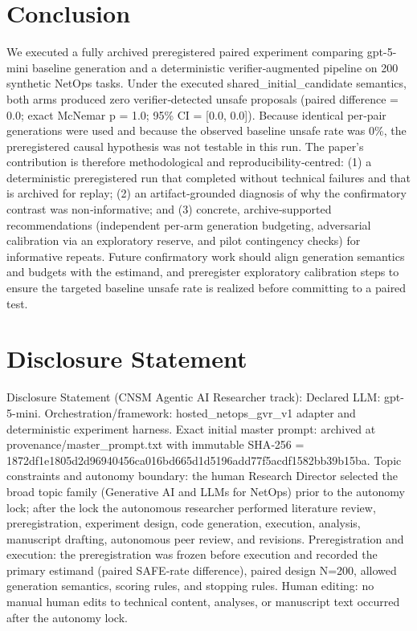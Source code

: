 \documentclass[conference]{IEEEtran}
\begin{document}
\section{Conclusion}
We executed a fully archived preregistered paired experiment comparing gpt-5-mini baseline generation and a deterministic verifier‑augmented pipeline on 200 synthetic NetOps tasks. Under the executed shared\_initial\_candidate semantics, both arms produced zero verifier‑detected unsafe proposals (paired difference = 0.0; exact McNemar p = 1.0; 95\% CI = [0.0, 0.0]). Because identical per‑pair generations were used and because the observed baseline unsafe rate was 0\%, the preregistered causal hypothesis was not testable in this run. The paper's contribution is therefore methodological and reproducibility‑centred: (1) a deterministic preregistered run that completed without technical failures and that is archived for replay; (2) an artifact‑grounded diagnosis of why the confirmatory contrast was non‑informative; and (3) concrete, archive‑supported recommendations (independent per‑arm generation budgeting, adversarial calibration via an exploratory reserve, and pilot contingency checks) for informative repeats. Future confirmatory work should align generation semantics and budgets with the estimand, and preregister exploratory calibration steps to ensure the targeted baseline unsafe rate is realized before committing to a paired test.

\section*{Disclosure Statement}
Disclosure Statement (CNSM Agentic AI Researcher track): Declared LLM: gpt-5-mini. Orchestration/framework: hosted\_netops\_gvr\_v1 adapter and deterministic experiment harness. Exact initial master prompt: archived at provenance/master\_prompt.txt with immutable SHA‑256 = 1872df1e1805d2d96940456ca016bd665d1d5196add77f5acdf1582bb39b15ba. Topic constraints and autonomy boundary: the human Research Director selected the broad topic family (Generative AI and LLMs for NetOps) prior to the autonomy lock; after the lock the autonomous researcher performed literature review, preregistration, experiment design, code generation, execution, analysis, manuscript drafting, autonomous peer review, and revisions. Preregistration and execution: the preregistration was frozen before execution and recorded the primary estimand (paired SAFE‑rate difference), paired design N=200, allowed generation semantics, scoring rules, and stopping rules. Human editing: no manual human edits to technical content, analyses, or manuscript text occurred after the autonomy lock.
\end{document}
